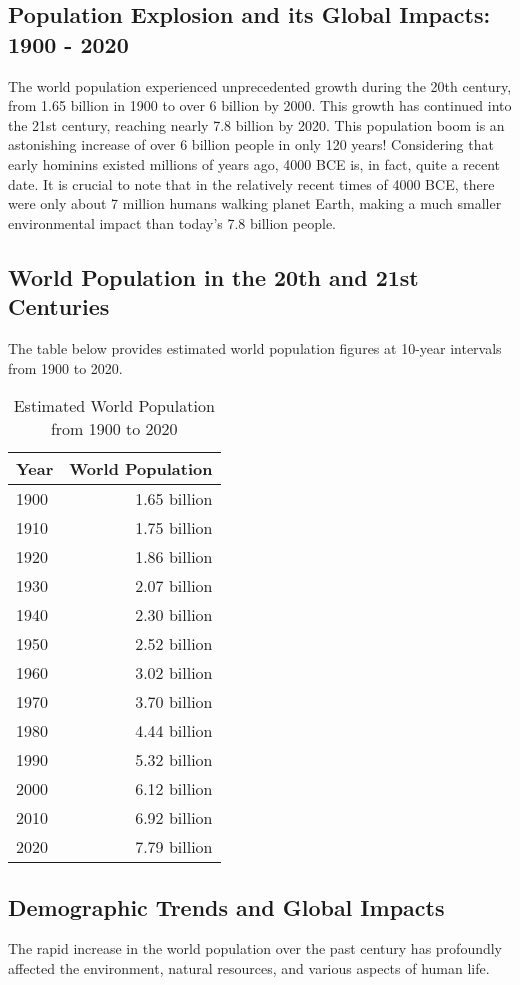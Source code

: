 \documentclass{book}
\begin{document}
\subsection*{Population Explosion and its Global Impacts: 1900 - 2020}
The world population experienced unprecedented growth during the 20th century, from 1.65 billion in 1900 to over 6 billion by 2000. This growth has continued into the 21st century, reaching nearly 7.8 billion by 2020. This population boom is an astonishing increase of over 6 billion people in only 120 years! Considering that early hominins existed millions of years ago, 4000 BCE is, in fact, quite a recent date. It is crucial to note that in the relatively recent times of 4000 BCE, there were only about 7 million humans walking planet Earth, making a much smaller environmental impact than today's 7.8 billion people.

\subsection*{World Population in the 20th and 21st Centuries}
The table below provides estimated world population figures at 10-year intervals from 1900 to 2020.

\begin{table}[h!]
\centering
\begin{tabular}{|l|r|}
\hline
Year & World Population \\
\hline
1900 & 1.65 billion \\
1910 & 1.75 billion \\
1920 & 1.86 billion \\
1930 & 2.07 billion \\
1940 & 2.30 billion \\
1950 & 2.52 billion \\
1960 & 3.02 billion \\
1970 & 3.70 billion \\
1980 & 4.44 billion \\
1990 & 5.32 billion \\
2000 & 6.12 billion \\
2010 & 6.92 billion \\
2020 & 7.79 billion \\
\hline
\end{tabular}
\caption{Estimated World Population from 1900 to 2020}
\label{tab:world_population_1900_2020}
\end{table}

\subsection*{Demographic Trends and Global Impacts}
The rapid increase in the world population over the past century has profoundly affected the environment, natural resources, and various aspects of human life.
\end{document}
